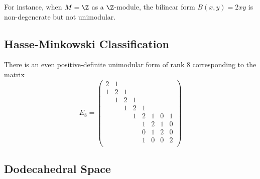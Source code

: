 \begin{example}
	For instance, when $M=\Z$ as a $\Z$-module, the bilinear form $B(x,y)=2xy$ is non-degenerate but not unimodular.
\end{example}

\subsection*{Hasse-Minkowski Classification}

\begin{proposition}
	There is an even positive-definite unimodular form of rank $8$ corresponding to the matrix
	\[
		E_8 = \begin{pmatrix}
			2 & 1 &   &   &   &   &   &   \\
			1 & 2 & 1 &   &   &   &   &   \\
			  & 1 & 2 & 1 &   &   &   &   \\
			  &   & 1 & 2 & 1 &   &   &   \\
			  &   &   & 1 & 2 & 1 & 0 & 1 \\
			  &   &   &   & 1 & 2 & 1 & 0 \\
			  &   &   &   & 0 & 1 & 2 & 0 \\
			  &   &   &   & 1 & 0 & 0 & 2 \\
		\end{pmatrix}
	\]
\end{proposition}

\subsection*{Dodecahedral Space}

